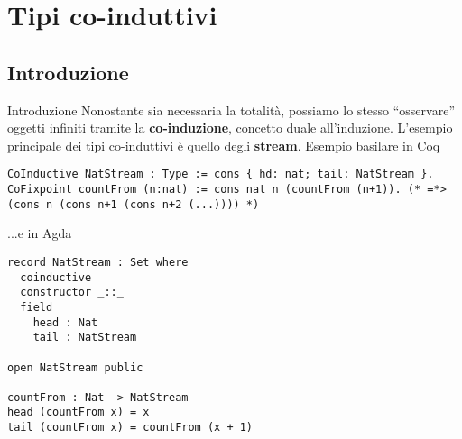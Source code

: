 \documentclass[t,aspectratio=169,10pt]{beamer}
\begin{document}
\section[coinduttivi]{Tipi co-induttivi}
\subsection{Introduzione}
\begin{frame}[fragile]{Introduzione}
	Nonostante sia necessaria la totalità, possiamo lo stesso ``osservare'' oggetti
	infiniti tramite la {\bf co-induzione}, concetto duale all'induzione. L'esempio
	principale dei tipi co-induttivi è quello degli {\bf stream}. Esempio basilare in
	Coq
	\begin{verbatim}
CoInductive NatStream : Type := cons { hd: nat; tail: NatStream }.
CoFixpoint countFrom (n:nat) := cons nat n (countFrom (n+1)). (* =*> (cons n (cons n+1 (cons n+2 (...)))) *)
\end{verbatim}
	...e in Agda
	\begin{verbatim}
record NatStream : Set where
  coinductive
  constructor _::_
  field
    head : Nat
    tail : NatStream

open NatStream public 

countFrom : Nat -> NatStream 
head (countFrom x) = x 
tail (countFrom x) = countFrom (x + 1)
\end{verbatim}
\end{frame}
\end{document}

